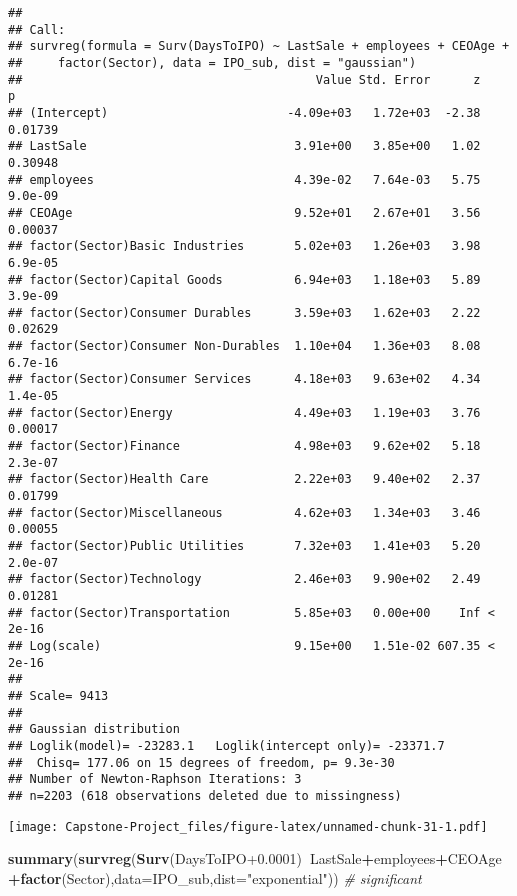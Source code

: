 \documentclass[]{article}
\newenvironment{Shaded}{\begin{snugshade}}{\end{snugshade}}
\newcommand{\CommentTok}[1]{\textcolor[rgb]{0.56,0.35,0.01}{\textit{#1}}}
\newcommand{\DataTypeTok}[1]{\textcolor[rgb]{0.13,0.29,0.53}{#1}}
\newcommand{\FloatTok}[1]{\textcolor[rgb]{0.00,0.00,0.81}{#1}}
\newcommand{\KeywordTok}[1]{\textcolor[rgb]{0.13,0.29,0.53}{\textbf{#1}}}
\newcommand{\NormalTok}[1]{#1}
\newcommand{\OperatorTok}[1]{\textcolor[rgb]{0.81,0.36,0.00}{\textbf{#1}}}
\newcommand{\StringTok}[1]{\textcolor[rgb]{0.31,0.60,0.02}{#1}}
\begin{document}
\begin{verbatim}
## 
## Call:
## survreg(formula = Surv(DaysToIPO) ~ LastSale + employees + CEOAge + 
##     factor(Sector), data = IPO_sub, dist = "gaussian")
##                                         Value Std. Error      z       p
## (Intercept)                         -4.09e+03   1.72e+03  -2.38 0.01739
## LastSale                             3.91e+00   3.85e+00   1.02 0.30948
## employees                            4.39e-02   7.64e-03   5.75 9.0e-09
## CEOAge                               9.52e+01   2.67e+01   3.56 0.00037
## factor(Sector)Basic Industries       5.02e+03   1.26e+03   3.98 6.9e-05
## factor(Sector)Capital Goods          6.94e+03   1.18e+03   5.89 3.9e-09
## factor(Sector)Consumer Durables      3.59e+03   1.62e+03   2.22 0.02629
## factor(Sector)Consumer Non-Durables  1.10e+04   1.36e+03   8.08 6.7e-16
## factor(Sector)Consumer Services      4.18e+03   9.63e+02   4.34 1.4e-05
## factor(Sector)Energy                 4.49e+03   1.19e+03   3.76 0.00017
## factor(Sector)Finance                4.98e+03   9.62e+02   5.18 2.3e-07
## factor(Sector)Health Care            2.22e+03   9.40e+02   2.37 0.01799
## factor(Sector)Miscellaneous          4.62e+03   1.34e+03   3.46 0.00055
## factor(Sector)Public Utilities       7.32e+03   1.41e+03   5.20 2.0e-07
## factor(Sector)Technology             2.46e+03   9.90e+02   2.49 0.01281
## factor(Sector)Transportation         5.85e+03   0.00e+00    Inf < 2e-16
## Log(scale)                           9.15e+00   1.51e-02 607.35 < 2e-16
## 
## Scale= 9413 
## 
## Gaussian distribution
## Loglik(model)= -23283.1   Loglik(intercept only)= -23371.7
##  Chisq= 177.06 on 15 degrees of freedom, p= 9.3e-30 
## Number of Newton-Raphson Iterations: 3 
## n=2203 (618 observations deleted due to missingness)
\end{verbatim}

\texttt{[image: Capstone-Project\_files/figure-latex/unnamed-chunk-31-1.pdf]}

\begin{Shaded}
\begin{Highlighting}[]
\KeywordTok{summary}\NormalTok{(}\KeywordTok{survreg}\NormalTok{(}\KeywordTok{Surv}\NormalTok{(DaysToIPO}\FloatTok{+0.0001}\NormalTok{)}\OperatorTok{~}\NormalTok{LastSale}\OperatorTok{+}\NormalTok{employees}\OperatorTok{+}\NormalTok{CEOAge}\OperatorTok{+}\KeywordTok{factor}\NormalTok{(Sector),}\DataTypeTok{data=}\NormalTok{IPO_sub,}\DataTypeTok{dist=}\StringTok{"exponential"}\NormalTok{)) }\CommentTok{# significant}
\end{Highlighting}
\end{Shaded}
\end{document}
